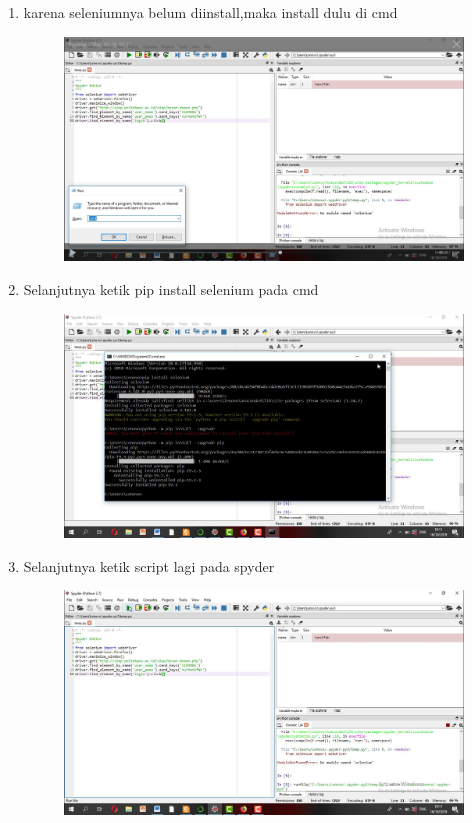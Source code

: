\begin{enumerate}
\begin{enumerate}
\begin{enumerate}
\begin{enumerate}
\begin{enumerate}
\begin{enumerate}
\begin{enumerate}
\begin{figure}[h]
    \caption{}
    \label{fig:my_label}
\end{figure}
\item   karena seleniumnya belum diinstall,maka install dulu di cmd
\begin{figure}[h]
    \centering
    \includegraphics[scale=0.2]{gambar/40.png}
    \caption{}
    \label{fig:my_label}
\end{figure}
\item  Selanjutnya ketik pip install selenium pada cmd
\begin{figure}[h]
    \centering
    \includegraphics[scale=0.2]{gambar/41.png}
    \caption{}
    \label{fig:my_label}
\end{figure}
\item  Selanjutnya ketik script lagi pada spyder
\begin{figure}[h]
    \centering
    \includegraphics[scale=0.2]{gambar/42.png}

\end{figure}
\end{enumerate}
\end{enumerate}
\end{enumerate}
\end{enumerate}
\end{enumerate}
\end{enumerate}
\end{enumerate}

